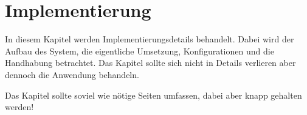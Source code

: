 \chapter{Implementierung}
\label{cahp:impl}

In diesem Kapitel werden Implementierungsdetails behandelt. Dabei wird der Aufbau des System, die eigentliche Umsetzung, Konfigurationen und die Handhabung betrachtet. Das Kapitel sollte sich nicht in Details verlieren aber dennoch die Anwendung behandeln. 

Das Kapitel sollte soviel wie nötige Seiten umfassen, dabei aber knapp gehalten werden!